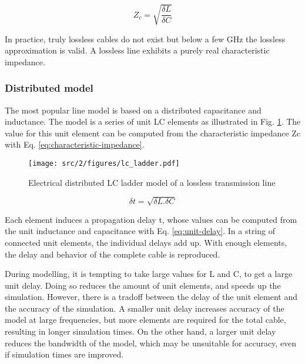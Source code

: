 \begin{equation}
Z_{c} = \sqrt{\frac{\delta L}{\delta C}}
\label{eq:characteristic-impedance}
\end{equation}

In practice, truly lossless cables do not exist but below a few GHz the lossless approximation is valid.
A lossless line exhibits a purely real characteristic impedance.

\subsubsection{Distributed model}
The most popular line model is based on a distributed capacitance and inductance.
The model is a series of unit LC elements as illustrated in Fig. \ref{fig:dis-line-model}.
The value for this unit element can be computed from the characteristic impedance \gls{Zc} with Eq. \ref{eq:characteristic-impedance}.

\begin{figure}[!h]
  \centering
  \texttt{[image: src/2/figures/lc\_ladder.pdf]}
  \caption{Electrical distributed LC ladder model of a lossless transmission line}
  \label{fig:dis-line-model}
\end{figure}

\begin{equation}
\delta t = \sqrt{\delta L.\delta C}
\label{eq:unit-delay}
\end{equation}

Each element induces a propagation delay \textdelta{}t, whose values can be computed from the unit inductance and capacitance with Eq. \ref{eq:unit-delay}.
In a string of connected unit elements, the individual delays add up.
With enough elements, the delay and behavior of the complete cable is reproduced.

During modelling, it is tempting to take large values for \textdelta{}L and \textdelta{}C, to get a large unit delay.
Doing so reduces the amount of unit elements, and speeds up the simulation.
However, there is a tradoff between the delay of the unit element and the accuracy of the simulation.
A smaller unit delay increases accuracy of the model at large frequencies, but more elements are required for the total cable, resulting in longer simulation times.
On the other hand, a larger unit delay reduces the bandwidth of the model, which may be unsuitable for accuracy, even if simulation times are improved.

